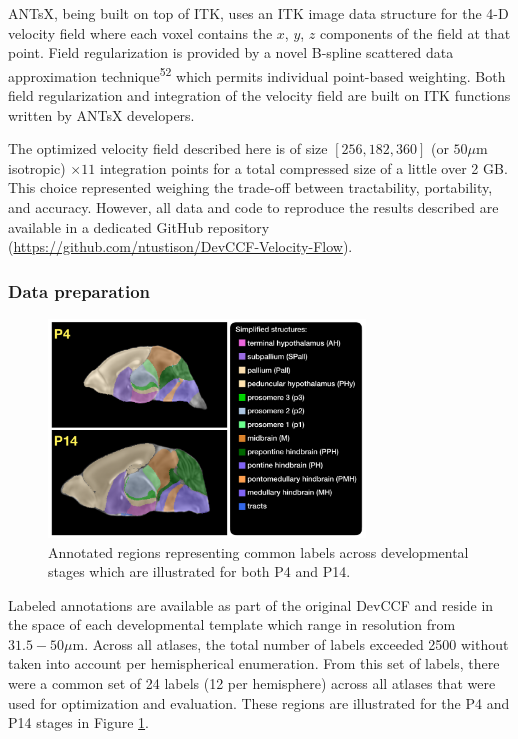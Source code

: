 \documentclass[
  12pt,
]{article}
\begin{document}
ANTsX, being built on top of ITK, uses an ITK image data structure for
the 4-D velocity field where each voxel contains the \(x\), \(y\), \(z\)
components of the field at that point. Field regularization is provided
by a novel B-spline scattered data approximation
technique\textsuperscript{52} which permits individual point-based
weighting. Both field regularization and integration of the velocity
field are built on ITK functions written by ANTsX developers.

The optimized velocity field described here is of size
\([256, 182, 360]\) (or \(50 \mu\)m isotropic) \(\times 11\) integration
points for a total compressed size of a little over 2 GB. This choice
represented weighing the trade-off between tractability, portability,
and accuracy. However, all data and code to reproduce the results
described are available in a dedicated GitHub repository
(\url{https://github.com/ntustison/DevCCF-Velocity-Flow}).

\hypertarget{data-preparation}{%
\subsubsection*{Data preparation}\label{data-preparation}}

\begin{figure}[!htb]
\centering
\includegraphics[width=0.75\textwidth]{Figures/SimplifiedAnnotations.pdf}
\caption{Annotated regions representing common labels across developmental stages which
are illustrated for both P4 and P14.}
\label{fig:simplifiedannotations}
\end{figure}

Labeled annotations are available as part of the original DevCCF and
reside in the space of each developmental template which range in
resolution from \(31.5-50 \mu\)m. Across all atlases, the total number
of labels exceeded 2500 without taken into account per hemispherical
enumeration. From this set of labels, there were a common set of 24
labels (12 per hemisphere) across all atlases that were used for
optimization and evaluation. These regions are illustrated for the P4
and P14 stages in Figure \ref{fig:simplifiedannotations}.
\end{document}
